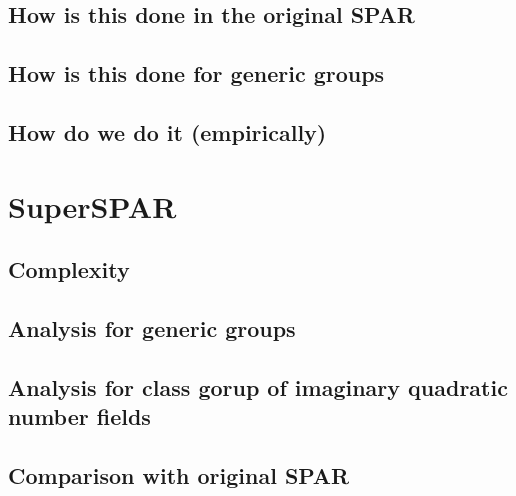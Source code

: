 \documentclass{ucalgthes1}
\theoremstyle{plain}
\theoremstyle{definition}
\begin{document}
\subsection{How is this done in the original SPAR}

\subsection{How is this done for generic groups}

\subsection{How do we do it (empirically)}


\section{SuperSPAR}

\subsection{Complexity}
\subsection{Analysis for generic groups}
\subsection{Analysis for class gorup of imaginary quadratic number fields}
\subsection{Comparison with original SPAR}
\end{document}
